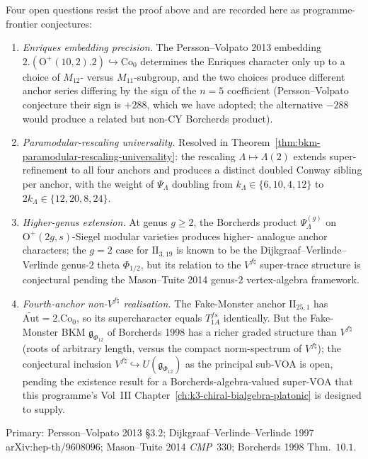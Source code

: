 \begin{remark}
\label{rem:bkm-anchor-open-threads}
Four open questions resist the proof above and are recorded here as
programme-frontier conjectures:
\begin{enumerate}[label=\textup{(\roman*)}]
\item \emph{Enriques embedding precision.} The Persson--Volpato 2013
embedding $2.(\mathrm{O}^+(10,2).2)\hookrightarrow\mathrm{Co}_0$
determines the Enriques character only up to a choice of $M_{12}$-
versus $M_{11}$-subgroup, and the two choices produce different
anchor series differing by the sign of the $n=5$ coefficient
(Persson--Volpato conjecture their sign is $+288$, which we have
adopted; the alternative $-288$ would produce a related but non-CY
Borcherds product).
\item \emph{Paramodular-rescaling universality.} Resolved in
Theorem~\ref{thm:bkm-paramodular-rescaling-universality}: the
rescaling $\Lambda\mapsto\Lambda(2)$ extends super-refinement to
all four anchors and produces a distinct doubled Conway sibling per
anchor, with the weight of $\Psi_\Lambda$ doubling from
$k_\Lambda\in\{6,10,4,12\}$ to $2k_\Lambda\in\{12,20,8,24\}$.
\item \emph{Higher-genus extension.} At genus $g\geq 2$, the
Borcherds product $\Psi_\Lambda^{(g)}$ on
$\mathrm{O}^+(2g,s)$-Siegel modular varieties produces higher-
analogue anchor characters; the $g=2$ case for $\mathrm{II}_{3,19}$
is known to be the Dijkgraaf--Verlinde--Verlinde genus-$2$ theta
$\Phi_{1/2}$, but its relation to the $V^{f\natural}$ super-trace
structure is conjectural pending the Mason--Tuite 2014 genus-$2$
vertex-algebra framework.
\item \emph{Fourth-anchor non-$V^{f\natural}$ realisation.} The
Fake-Monster anchor $\mathrm{II}_{25,1}$ has
$\widetilde{\mathrm{Aut}}=2.\mathrm{Co}_0$, so its supercharacter
equals $T^{fs}_{1A}$ identically. But the Fake-Monster BKM
$\mathfrak{g}_{\Phi_{12}}$ of Borcherds 1998 has a richer graded
structure than $V^{f\natural}$ (roots of arbitrary length, versus the
compact norm-spectrum of $V^{f\natural}$); the conjectural inclusion
$V^{f\natural}\hookrightarrow U(\mathfrak{g}_{\Phi_{12}})$ as the
principal sub-VOA is open, pending the existence result for a
Borcherds-algebra-valued super-VOA that this programme's Vol~III
Chapter~\ref{ch:k3-chiral-bialgebra-platonic} is designed to supply.
\end{enumerate}
Primary:
Persson--Volpato 2013 \S$3.2$;
Dijkgraaf--Verlinde--Verlinde 1997 arXiv:hep-th/$9608096$;
Mason--Tuite 2014 \emph{CMP}~$330$;
Borcherds 1998 Thm.~$10.1$.
\end{remark}

